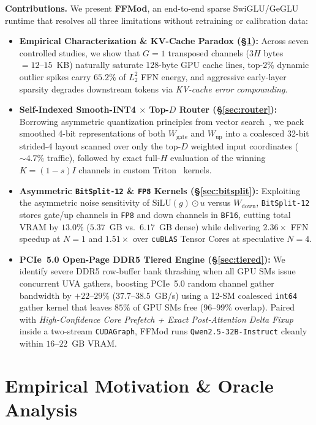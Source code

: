 \documentclass[10pt,twocolumn]{article}
\begin{document}
\textbf{Contributions.} We present \textbf{FFMod}, an end-to-end sparse SwiGLU/GeGLU runtime that resolves all three limitations without retraining or calibration data:
\begin{itemize}
  \item \textbf{Empirical Characterization \& KV-Cache Paradox (\S\ref{sec:empirical}):} Across seven controlled studies, we show that $G=1$ transposed channels ($3H$ bytes $= 12\text{--}15$~KB) naturally saturate 128-byte GPU cache lines, top-$2\%$ dynamic outlier spikes carry $65.2\%$ of $L_2^2$ FFN energy, and aggressive early-layer sparsity degrades downstream tokens via \emph{KV-cache error compounding}.
  \item \textbf{Self-Indexed Smooth-INT4 $\times$ Top-$D$ Router (\S\ref{sec:router}):} Borrowing asymmetric quantization principles from vector search~\cite{guo2020scann,gao2024rabitq}, we pack smoothed 4-bit representations of both $W_{\mathrm{gate}}$ and $W_{\mathrm{up}}$ into a coalesced 32-bit strided-4 layout scanned over only the top-$D$ weighted input coordinates ($\sim 4.7\%$ traffic), followed by exact full-$H$ evaluation of the winning $K=(1-s)I$ channels in custom Triton~\cite{tillet2019triton} kernels.
  \item \textbf{Asymmetric \texttt{BitSplit-12} \& \texttt{FP8} Kernels (\S\ref{sec:bitsplit}):} Exploiting the asymmetric noise sensitivity of $\mathrm{SiLU}(g)\odot u$ versus $W_{\mathrm{down}}$, \texttt{BitSplit-12} stores gate/up channels in \texttt{FP8} and down channels in \texttt{BF16}, cutting total VRAM by $13.0\%$ ($5.37$~GB vs.\ $6.17$~GB dense) while delivering $2.36\times$ FFN speedup at $N=1$ and $1.51\times$ over \texttt{cuBLAS} Tensor Cores at speculative $N=4$.
  \item \textbf{PCIe~5.0 Open-Page DDR5 Tiered Engine (\S\ref{sec:tiered}):} We identify severe DDR5 row-buffer bank thrashing when all GPU SMs issue concurrent UVA gathers, boosting PCIe~5.0 random channel gather bandwidth by $+22\text{--}29\%$ ($37.7\text{--}38.5$~GB/s) using a 12-SM coalesced \texttt{int64} gather kernel that leaves $85\%$ of GPU SMs free ($96\text{--}99\%$ overlap). Paired with \emph{High-Confidence Core Prefetch + Exact Post-Attention Delta Fixup} inside a two-stream \texttt{CUDAGraph}, FFMod runs \texttt{Qwen2.5-32B-Instruct} cleanly within $16\text{--}22$~GB VRAM.
\end{itemize}

\section{Empirical Motivation \& Oracle Analysis}
\label{sec:empirical}
\end{document}
